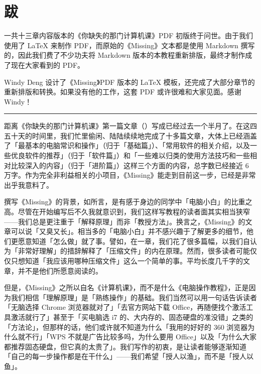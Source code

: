 \chapter*{跋}
\label{afterwords}

一共十三章内容版本的《你缺失的那门计算机课》PDF 初版终于问世。由于我们使用了 \LaTeX{} 来制作 PDF，而原始的《Missing》文本都是使用 Markdown 撰写的，因此我们费了不少功夫将 Markdown 版本的本教程重新排版，最终才制作成了现在大家看到的 PDF。

Windy Deng 设计了《Missing》PDF 版本的 \LaTeX{} 模板，还完成了大部分章节的重新排版和转换。如果没有他的工作，这套 PDF 或许很难和大家见面。感谢 Windy！


\begin{center}\rule{0.5\linewidth}{0.5pt}\end{center}

距离《你缺失的那门计算机课》第一篇文章（）写成已经过去一个半月了。在这四五十天的时间里，我们忙里偷闲、陆陆续续地完成了十多篇文章，大体上已经涵盖了「最基本的电脑常识和操作」（归于「基础篇」）、「常用软件的相关介绍，以及一些优良软件的推荐」（归于「软件篇」）和「一些难以归类的使用方法技巧和一些相对比较深入的内容」（归于「进阶篇」）这样三个方面的内容，总字数已经接近 6 万字。作为完全非利益相关的小项目，《Missing》能走到目前这一步，已经是非常出乎我意料了。

撰写《Missing》的背景，如所言，是有感于身边的同学中「电脑小白」的比重之高。尽管在开始编写后不久我就意识到，我们这样写教程的读者面其实相当狭窄——我们总是更注重于「解释原理」而非「教授方法」。换言之，《Missing》的文章可以说「又臭又长」。相当多的「电脑小白」并不感兴趣于了解更多的细节，他们更愿意知道「怎么做」就了事。譬如，在一章，我们花了很多篇幅，以我们自认为「非常好理解」的措辞解释了「压缩文件」的内在原理。然而，很多读者可能仅仅只想知道「我应该用哪种压缩文件」这么一个简单的事。平均长度几千字的文章，并不是他们所愿意阅读的。

但是，《Missing》之所以自名《计算机课》，而不是什么《电脑操作教程》，正是因为我们相信「理解原理」是「熟练操作」的基础。我们当然可以用一句话告诉读者「无脑选择 Chrome 浏览器就对了」「去官方网站下载 Office，再随便找个激活工具激活就行了」甚至于「买电脑选 i7 的、大内存的、固态硬盘的准没错」之类的「方法论」，但那样的话，他们或许就不知道为什么「我用的好好的 360 浏览器为什么就不行」「WPS 不就是广告比较多吗，为什么要用 Office」以及「为什么大家都推荐固态硬盘，但它真的太贵了」。我们写作的初衷，是让读者能够逐渐知道「自己的每一步操作都是在干什么」——我们希望「授人以渔」，而不是「授人以鱼」。


